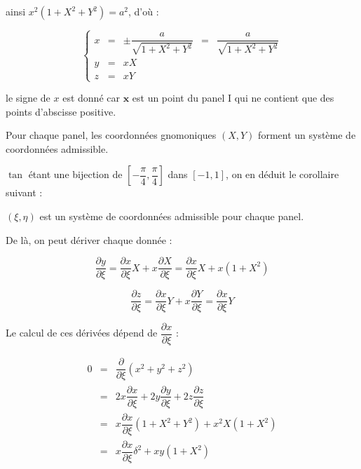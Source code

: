 ainsi $x^2 \left( 1+X^2+Y^2 \right) = a^2$, d'où :

\begin{equation}
\left\lbrace
\begin{array}{rclcl}
x & = & \pm \dfrac{a}{\sqrt{1+X^2+Y^2}}& = & \dfrac{a}{\sqrt{1+X^2+Y^2}}\\
y & = & xX &&\\
z & = & xY &&
\end{array}
\right.
\end{equation}

le signe de $x$ est donné car $\mathbf{x}$ est un point du panel I qui ne contient que des points d'abscisse positive.

\begin{theoreme}
Pour chaque panel, les coordonnées gnomoniques $(X,Y)$ forment un système de coordonnées admissible.
\end{theoreme}

$\tan$ étant une bijection de $\left[ -\dfrac{\pi}{4}, \dfrac{\pi}{4} \right]$ dans $\left[-1,1\right]$, on en déduit le corollaire suivant :

\begin{corollaire}
$(\xi, \eta)$ est un système de coordonnées admissible pour chaque panel.
\end{corollaire}

De là, on peut dériver chaque donnée :

\begin{equation}
\dfrac{\partial y}{\partial \xi} = \dfrac{\partial x}{\partial \xi} X + x \dfrac{\partial X}{\partial \xi} = \dfrac{\partial x}{\partial \xi} X + x(1+X^2)
\end{equation}

\begin{equation}
\dfrac{\partial z}{\partial \xi} = \dfrac{\partial x}{\partial \xi} Y + x \dfrac{\partial Y}{\partial \xi} = \dfrac{\partial x}{\partial \xi} Y
\end{equation}

Le calcul de ces dérivées dépend de $\dfrac{\partial x}{\partial \xi}$ :

\begin{equation*}
\begin{array}{rcl}
0 & = & \dfrac{\partial}{\partial \xi} ( x^2+y^2+z^2) \\
  & = & 2x\dfrac{\partial x}{\partial \xi} + 2y\dfrac{\partial y}{\partial \xi}+ 2z\dfrac{\partial z}{\partial \xi} \\
  & = & x \dfrac{\partial x}{\partial \xi} ( 1 +X^2 + Y^2) + x^2 X (1+X^2)\\
  & = & x \dfrac{\partial x}{\partial \xi} \delta^2 + xy (1+X^2)
\end{array}
\end{equation*}

